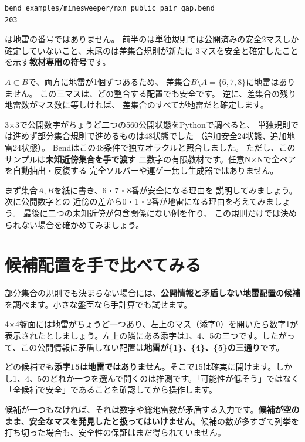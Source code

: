\documentclass[11pt,a4paper,openany]{book}
\newcommand{\code}[1]{\texttt{\detokenize{#1}}}
\newcommand{\term}[1]{\textbf{#1}}
\newcommand{\exercise}[1]{\begin{exercisebox}\RaggedRight #1\end{exercisebox}}
\begin{document}
\begin{lstlisting}[language={},caption={二数字の差集合を実行する}]
bend examples/minesweeper/nxn_public_pair_gap.bend
203
\end{lstlisting}

\code{203}は地雷の番号ではありません。
前半の\code{200}は単独規則では公開済みの安全2マスしか
確定していないこと、末尾の\code{3}は差集合規則が新たに
3マスを安全と確定したことを示す\textbf{教材専用の符号}です。

\(A\subset B\)で、両方に地雷が1個ずつあるため、
差集合\(B\setminus A=\{6,7,8\}\)に地雷はありません。
この三マスは、どの整合する配置でも安全です。
逆に、差集合の残り地雷数がマス数に等しければ、
差集合のすべてが地雷だと確定します。

3×3で公開数字がちょうど二つの560公開状態をPythonで調べると、
単独規則では進めず部分集合規則で進めるものは48状態でした
（追加安全24状態、追加地雷24状態）。
Bendはこの48条件で独立オラクルと照合しました。
ただし、このサンプルは\textbf{未知近傍集合を手で渡す}
二数字の有限教材です。任意N×Nで全ペアを自動抽出・反復する
完全ソルバーや運ゲー無し生成器ではありません。

\exercise{まず集合\(A,B\)を紙に書き、6・7・8番が安全になる理由を
説明してみましょう。次に公開数字\code{(4,4)}と\code{(7,1)}の
近傍の差から0・1・2番が地雷になる理由を考えてみましょう。
最後に二つの未知近傍が包含関係にない例を作り、
この規則だけでは決められない場合を確かめてみましょう。}

\section{候補配置を手で比べてみる}
部分集合の規則でも決まらない場合には、\term{公開情報と矛盾しない地雷配置の候補}を調べます。小さな盤面なら手計算でも試せます。

4×4盤面には地雷がちょうど一つあり、左上のマス（添字0）を開いたら数字1が表示されたとしましょう。左上の隣にある添字は1、4、5の三つです。したがって、この公開情報に矛盾しない配置は\textbf{地雷が\{1\}、\{4\}、\{5\}の三通り}です。

どの候補でも\textbf{添字15は地雷ではありません}。そこで15は確実に開けます。しかし1、4、5のどれか一つを選んで開くのは推測です。「可能性が低そう」ではなく「全候補で安全」であることを確認してから操作します。

候補が一つもなければ、それは数字や総地雷数が矛盾する入力です。\textbf{候補が空のまま、安全なマスを発見したと扱ってはいけません}。候補の数が多すぎて列挙を打ち切った場合も、安全性の保証はまだ得られていません。
\end{document}
